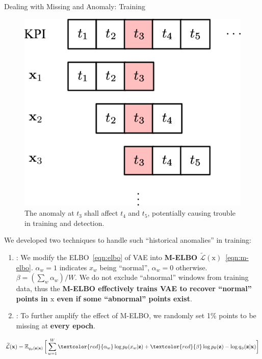 \documentclass[usenames,dvipsnames]{beamer}
\newcommand{\emphasis}[1]{\textbf{\textcolor{emphcolor}{#1}}}
\newcommand{\vv}[1]{\bm{\mathrm{{#1}}}}
\newcommand{\E}{\operatorname{\mathbb{E}}}
\begin{document}
\begin{frame}{Dealing with Missing and Anomaly: Training}
  \begin{minipage}[t]{.3\linewidth}
    \begin{figure}
      \centering
      \includegraphics[height=.35\textheight]{sliding-windows-error}
      \caption{The anomaly at $t_3$ shall affect $t_4$ and $t_5$, potentially causing trouble in training and detection.}
    \end{figure}
  \end{minipage}\hfill
  \begin{minipage}[t]{.66\linewidth}
    We developed two techniques to handle such ``historical anomalies'' in training:
    \begin{enumerate}\setlength\itemsep{.2em}
      \item {}: We modify the ELBO~\eqref{eqn:elbo} of VAE into \emphasis{M-ELBO $\widetilde{\mathcal{L}}(\vv{x})$}~\eqref{eqn:m-elbo}. $\alpha_w=1$ indicates $x_w$ being ``normal'', $\alpha_w=0$ otherwise.  $\beta = (\sum_w \alpha_w) / W$.
        We do not exclude ``abnormal'' windows from training data, thus the \emphasis{M-ELBO effectively trains VAE to recover ``normal'' points in $\vv{x}$ even if some ``abnormal'' points exist}.
      \item {}: To further amplify the effect of M-ELBO, we randomly set 1\% points to be missing at \emphasis{every epoch}.
    \end{enumerate}
  \end{minipage}
  
  \begin{equation}
    \widetilde{\mathcal{L}}(\vv{x}) = \E_{q_{\phi}(\vv{z}|\vv{x})}\bigg[\sum_{w=1}^W \textcolor{red}{\alpha_w} \log p_{\theta}(x_w|\vv{z}) + \textcolor{red}{\beta} \log p_{\theta}(\vv{z}) - \log q_{\phi}(\vv{z}|\vv{x})\bigg] \label{eqn:m-elbo}
  \end{equation}
\end{frame}
\end{document}
